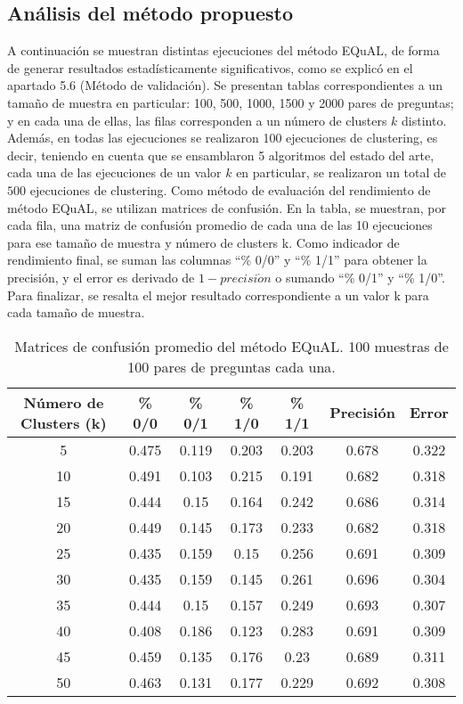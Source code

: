 \subsection{Análisis del método propuesto}

A continuación se muestran distintas ejecuciones del método EQuAL, de forma de generar resultados estadísticamente significativos, como se explicó en el apartado 5.6 (Método de validación). Se presentan tablas correspondientes a un tamaño de muestra en particular: 100, 500, 1000, 1500 y 2000 pares de preguntas; y en cada una de ellas, las filas corresponden a un número de clusters \(k\) distinto. Además, en todas las ejecuciones se realizaron 100 ejecuciones de clustering, es decir, teniendo en cuenta que se ensamblaron 5 algoritmos del estado del arte, cada una de las ejecuciones de un valor \(k\) en particular, se realizaron un total de \(500\) ejecuciones de clustering. Como método de evaluación del rendimiento de método EQuAL, se utilizan matrices de confusión. En la tabla, se muestran, por cada fila, una matriz de confusión promedio de cada una de las 10 ejecuciones para ese tamaño de muestra y número de clusters k. Como indicador de rendimiento final, se suman las columnas “\% 0/0” y “\% 1/1” para obtener la precisión, y el error es derivado de \(1 - precisi\acute{o}n\) o sumando “\% 0/1” y “\% 1/0”. Para finalizar, se resalta el mejor resultado correspondiente a un valor k para cada tamaño de muestra.

\begin{table}[]
	\centering
	\begin{tabular}{|c|c|c|c|c|c|c|}
		\hline
		\rowcolor[HTML]{CFE2F3}
		\textbf{Número de Clusters (k)} & \textbf{\% 0/0} & \textbf{\% 0/1} & \textbf{\% 1/0} & \textbf{\% 1/1} & \textbf{Precisión} & \textbf{Error} \\ \hline
		5  & 0.475 & 0.119 & 0.203 & 0.203 & 0.678 & 0.322 \\ \hline
		10 & 0.491 & 0.103 & 0.215 & 0.191 & 0.682 & 0.318 \\ \hline
		15 & 0.444 & 0.15  & 0.164 & 0.242 & 0.686 & 0.314 \\ \hline
		20 & 0.449 & 0.145 & 0.173 & 0.233 & 0.682 & 0.318 \\ \hline
		25 & 0.435 & 0.159 & 0.15  & 0.256 & 0.691 & 0.309 \\ \hline
		\rowcolor[HTML]{D9EAD3}
		30 & 0.435 & 0.159 & 0.145 & 0.261 & 0.696 & 0.304 \\ \hline
		35 & 0.444 & 0.15  & 0.157 & 0.249 & 0.693 & 0.307 \\ \hline
		40 & 0.408 & 0.186 & 0.123 & 0.283 & 0.691 & 0.309 \\ \hline
		45 & 0.459 & 0.135 & 0.176 & 0.23  & 0.689 & 0.311 \\ \hline
		50 & 0.463 & 0.131 & 0.177 & 0.229 & 0.692 & 0.308 \\ \hline
	\end{tabular}
	\caption{Matrices de confusión promedio del método EQuAL. 100 muestras de 100 pares de preguntas cada una. }
	\label{tab:analisis-100-100}
\end{table}

